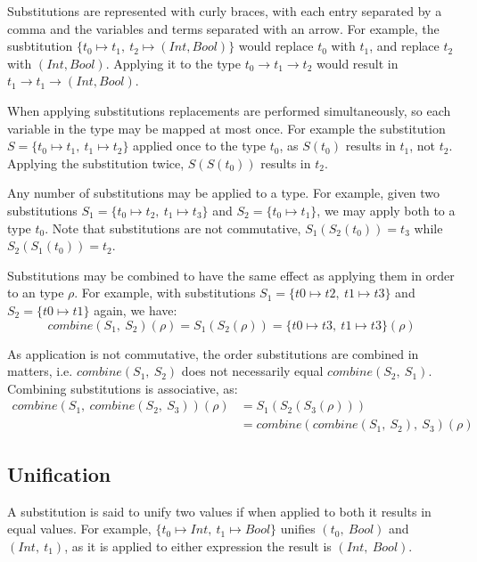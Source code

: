 \documentclass[a4paper,fleqn,oneside,12pt]{report}
\begin{document}
Substitutions are represented with curly braces, with each entry separated by a comma and the variables and terms separated with an arrow. For example, the susbtitution $\{ t_0 \mapsto t_1,\ t_2 \mapsto (Int, Bool) \}$ would replace $t_0$ with $t_1$, and replace $t_2$ with $(Int, Bool)$. Applying it to the type $t_0 \rightarrow t_1 \rightarrow t_2$ would result in $t_1 \rightarrow t_1 \rightarrow (Int, Bool)$.

When applying substitutions replacements are performed simultaneously, so each variable in the type may be mapped at most once. For example the substitution $S = \{ t_0 \mapsto t_1,\ t_1 \mapsto t_2 \}$ applied once to the type $t_0$, as $S(t_0)$ results in $t_1$, not $t_2$. Applying the substitution twice, $S(S(t_0))$ results in $t_2$.

Any number of substitutions may be applied to a type. For example, given two substitutions $S_1 = \{ t_0 \mapsto t_2,\ t_1 \mapsto t_3 \}$ and $S_2 = \{ t_0 \mapsto t_1 \}$, we may apply both to a type $t_0$. Note that substitutions are not commutative, $S_1(S_2(t_0)) = t_3$ while $S_2(S_1(t_0)) = t_2$.

Substitutions may be combined to have the same effect as applying them in order to an type $\rho$. For example, with substitutions $S_1 = \{ t0 \mapsto t2,\ t1 \mapsto t3 \}$ and $S_2 = \{ t0 \mapsto t1 \}$ again, we have:
$$\mathit{combine}(S_1,\ S_2)(\rho) = S_1(S_2(\rho)) = \{ t0 \mapsto t3,\ t1 \mapsto t3 \}(\rho)$$

As application is not commutative, the order substitutions are combined in matters, i.e. $\mathit{combine}(S_1,\ S_2)$ does not necessarily equal $\mathit{combine}(S_2,\ S_1)$. Combining substitutions is associative, as:
\begin{align*}
  \mathit{combine}(S_1,\ \mathit{combine}(S_2,\ S_3))(\rho) & = S_1(S_2(S_3(\rho)))\\& = \mathit{combine}(\mathit{combine}(S_1,\ S_2),\ S_3)(\rho)
\end{align*}

\subsection{Unification}

A substitution is said to unify two values if when applied to both it results in equal values. For example, $\{ t_0 \mapsto Int,\ t_1 \mapsto Bool \}$ unifies $(t_0,\ Bool)$ and $(Int,\ t_1)$, as it is applied to either expression the result is $(Int,\ Bool)$.
\end{document}
